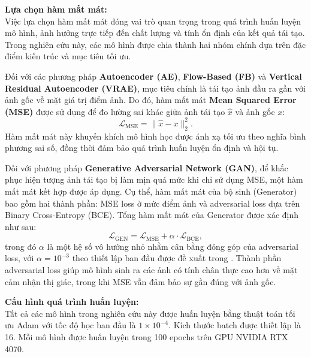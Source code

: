 \textbf{Lựa chọn hàm mất mát:}\\
Việc lựa chọn hàm mất mát đóng vai trò quan trọng trong quá trình huấn luyện mô hình, ảnh hưởng trực tiếp đến chất lượng và tính ổn định của kết quả tái tạo. Trong nghiên cứu này, các mô hình được chia thành hai nhóm chính dựa trên đặc điểm kiến trúc và mục tiêu tối ưu.

Đối với các phương pháp \textbf{Autoencoder (AE)}, \textbf{Flow-Based (FB)} và \textbf{Vertical Residual Autoencoder (VRAE)}, mục tiêu chính là tái tạo ảnh đầu ra gần với ảnh gốc về mặt giá trị điểm ảnh. Do đó, hàm mất mát \textbf{Mean Squared Error (MSE)} được sử dụng để đo lường sai khác giữa ảnh tái tạo $\hat{x}$ và ảnh gốc $x$:
\begin{equation}
\mathcal{L}_{\mathrm{MSE}} = \| \hat{x} - x \|_2^2.
\end{equation}
Hàm mất mát này khuyến khích mô hình học được ánh xạ tối ưu theo nghĩa bình phương sai số, đồng thời đảm bảo quá trình huấn luyện ổn định và hội tụ.

Đối với phương pháp \textbf{Generative Adversarial Network (GAN)}, để khắc phục hiện tượng ảnh tái tạo bị làm mịn quá mức khi chỉ sử dụng MSE, một hàm mất mát kết hợp được áp dụng. Cụ thể, hàm mất mát của bộ sinh (Generator) bao gồm hai thành phần: MSE loss ở mức điểm ảnh và adversarial loss dựa trên Binary Cross-Entropy (BCE). Tổng hàm mất mát của Generator được xác định như sau:
\begin{equation}
\mathcal{L}_{\mathrm{GEN}} = \mathcal{L}_{\mathrm{MSE}} + \alpha \cdot \mathcal{L}_{\mathrm{BCE}},
\end{equation}
trong đó $\alpha$ là một hệ số vô hướng nhỏ nhằm cân bằng đóng góp của adversarial loss, với $\alpha = 10^{-3}$ theo thiết lập ban đầu được đề xuất trong \citep{ledig2017photo}. Thành phần adversarial loss giúp mô hình sinh ra các ảnh có tính chân thực cao hơn về mặt cảm nhận thị giác, trong khi MSE vẫn đảm bảo sự gần đúng với ảnh gốc.

\textbf{Cấu hình quá trình huấn luyện:}\\

Tất cả các mô hình trong nghiên cứu này được huấn luyện bằng thuật toán tối ưu
Adam với tốc độ học ban đầu là $1 \times 10^{-4}$.
Kích thước batch được thiết lập là 16.
Mỗi mô hình được huấn luyện trong 100 epochs trên GPU NVIDIA RTX 4070.



